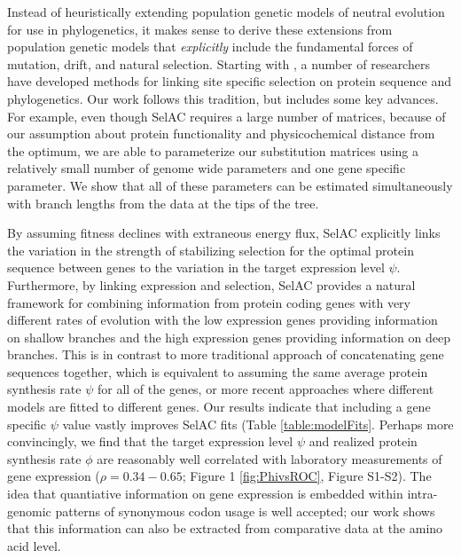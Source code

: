 \documentclass{article}
\newcommand{\selac}{SelAC\xspace}
\begin{document}
Instead of heuristically extending population genetic models of neutral evolution for use in phylogenetics, it makes sense to derive these extensions from population genetic models that \emph{explicitly} include the fundamental forces of mutation, drift, and natural selection. %
Starting with \citet{HalpernAndBruno1998}, a number of researchers have developed methods for linking site specific selection on protein sequence and phylogenetics\citep[e.g.~][]{KoshiEtAl1999,DimmicEtAl2000,KoshiAndGoldstein2001,RobinsonEtAl2003,LartillotAndPhilippe2004,ThorneEtAl2012,RodrigueAndLartillot2014}. %
Our work follows this tradition, but includes some key advances.
For example, even though \selac requires a large number of matrices, because of our assumption about protein functionality and physicochemical distance from the optimum, we are able to parameterize our substitution matrices using a relatively small number of genome wide parameters and one gene specific parameter.
We show that all of these parameters can be estimated simultaneously with branch lengths from the data at the tips of the tree.

By assuming fitness declines with extraneous energy flux, \selac explicitly links the variation in the strength of stabilizing selection for the optimal protein sequence between genes to the variation in the target expression level $\psi$.
Furthermore, by linking expression and selection, \selac provides a natural framework for combining information from protein coding genes with very different rates of evolution with the low expression genes providing information on shallow branches and the high expression genes providing information on deep branches.
This is in contrast to more traditional approach of concatenating gene sequences together, which is equivalent to assuming the same average protein synthesis rate $\psi$ for all of the genes, or more recent approaches where different models are fitted to different genes.
Our results indicate that including a gene specific $\psi$ value vastly improves \selac fits (Table \ref{table:modelFits}.
Perhaps more convincingly, we find that the target expression level $\psi$ and realized protein synthesis rate $\phi$ are reasonably well correlated with laboratory measurements of gene expression ($\rho = 0.34-0.65$; Figure 1 \ref{fig:PhivsROC}, Figure S1-S2).
The idea that quantiative information on gene expression is embedded within intra-genomic patterns of synonymous codon usage is well accepted; our work shows that this information can also be extracted from comparative data at the amino acid level.
\end{document}
